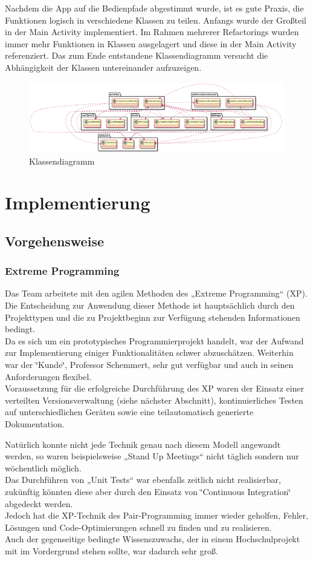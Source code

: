 \documentclass[a4paper,ngerman,12pt]{report}
\begin{document}
Nachdem die App auf die Bedienpfade abgestimmt wurde, ist es gute Praxis, die Funktionen logisch in verschiedene Klassen zu teilen. Anfangs wurde der Großteil in der Main Activity implementiert. Im Rahmen mehrerer Refactorings wurden immer mehr Funktionen in Klassen ausgelagert und diese in der Main Activity referenziert. Das zum Ende entstandene Klassendiagramm versucht die Abhängigkeit der Klassen untereinander aufzuzeigen.

 
\begin{figure}
\includegraphics[width=\textwidth]{general_class.png}
\caption{Klassendiagramm}
\end{figure}

\chapter{Implementierung}
\section{Vorgehensweise}
\subsection{Extreme Programming}

Das Team arbeitete mit den agilen Methoden des „Extreme Programming“ (XP). Die Entscheidung zur Anwendung dieser Methode ist hauptsächlich durch den Projekttypen und die zu Projektbeginn zur Verfügung stehenden Informationen bedingt. \\
Da es sich um ein prototypisches Programmierprojekt handelt, war der Aufwand zur Implementierung einiger Funktionalitäten schwer abzuschätzen. Weiterhin war der \char`\"{}Kunde\char`\"{}, Professor Schemmert, sehr gut verfügbar und auch in seinen Anforderungen flexibel.\\ Voraussetzung für die erfolgreiche Durchführung des XP waren der Einsatz einer verteilten Versionsverwaltung (siehe nächster Abschnitt), kontinuierliches Testen auf unterschiedlichen Geräten sowie eine teilautomatisch generierte Dokumentation.

Natürlich konnte nicht jede Technik genau nach diesem Modell angewandt werden, so waren beispielsweise „Stand Up Meetings“ nicht täglich sondern nur wöchentlich möglich.\\ 
Das Durchführen von „Unit Tests“ war ebenfalls zeitlich nicht realisierbar, zukünftig könnten diese aber durch den Einsatz von \char`\"{}\ac{Continuous Integration}\char`\"{} abgedeckt werden. \\
Jedoch hat die XP-Technik des Pair-Programming immer wieder geholfen, Fehler, Lösungen und Code-Optimierungen schnell zu finden und zu realisieren. \\
Auch der gegenseitige bedingte Wissenszuwachs, der in einem Hochschulprojekt mit im Vordergrund stehen sollte, war dadurch sehr groß.
\end{document}
